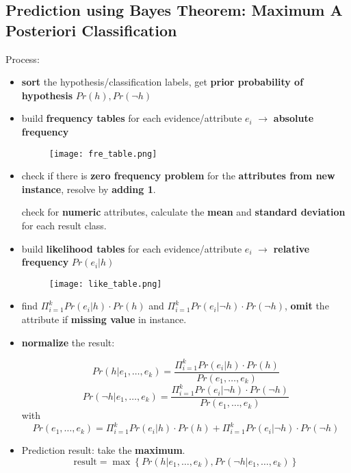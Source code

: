 \subsection{Prediction using Bayes Theorem: Maximum A Posteriori Classification }
Process:
\begin{itemize}
	\item \textbf{sort} the hypothesis/classification labels, get \textbf{prior probability of hypothesis} $Pr(h), Pr(\neg h)$
	\item  build \textbf{frequency tables} for each evidence/attribute $e_i$ $\rightarrow$ \textbf{absolute frequency}
	\begin{figure}[H]
		\centering
		\texttt{[image: fre\_table.png]}
	\end{figure}
	\item check if there is \textbf{zero frequency problem} for the \textbf{attributes from new instance}, resolve by \textbf{adding 1}. 
	
	check for \textbf{numeric} attributes, calculate the \textbf{mean} and \textbf{standard deviation} for each result class.
	\item build \textbf{likelihood tables} for each evidence/attribute $e_i$ $\rightarrow$ \textbf{relative frequency} $Pr(e_i|h)$
	\begin{figure}[H]
		\centering
		\texttt{[image: like\_table.png]}
	\end{figure}
	\item find $\Pi_{i=1}^k Pr(e_i|h) \cdot Pr(h)$ and $\Pi_{i=1}^k Pr(e_i|\neg h) \cdot Pr(\neg h)$, \textbf{omit} the attribute if \textbf{missing value} in instance.
	\item \textbf{normalize} the result: 
	
	$$Pr(h|e_1,\dots, e_k) = \frac{\Pi_{i=1}^k Pr(e_i|h) \cdot Pr(h)}{Pr(e_1, \dots, e_k)}$$
	$$Pr(\neg h|e_1,\dots, e_k) = \frac{\Pi_{i=1}^k Pr(e_i|\neg h) \cdot Pr(\neg h)}{Pr(e_1, \dots, e_k)}$$ 
	with
	$$Pr(e_1, \dots, e_k) = \Pi_{i=1}^k Pr(e_i|h) \cdot Pr(h) + \Pi_{i=1}^k Pr(e_i|\neg h) \cdot Pr(\neg h)$$

	\item Prediction result: take the \textbf{maximum}.
	$$\text{result} = \max\left\lbrace Pr(h|e_1,\dots, e_k), Pr(\neg h|e_1,\dots, e_k)\right\rbrace $$
\end{itemize}



